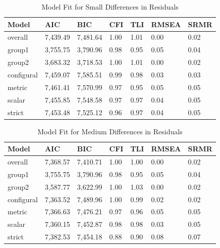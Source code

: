 \documentclass[
  man]{apa6}
\begin{document}
\begin{table}[tbp]

\begin{center}
\begin{threeparttable}

\caption{\label{tab:unnamed-chunk-8}Model Fit for Small Differences in Residuals}

\begin{tabular}{lllllll}
\toprule
Model & AIC & BIC & CFI & TLI & RMSEA & SRMR\\
\midrule
overall & 7,439.49 & 7,481.64 & 1.00 & 1.01 & 0.00 & 0.02\\
group1 & 3,755.75 & 3,790.96 & 0.98 & 0.95 & 0.05 & 0.04\\
group2 & 3,683.32 & 3,718.53 & 1.00 & 1.01 & 0.00 & 0.02\\
configural & 7,459.07 & 7,585.51 & 0.99 & 0.98 & 0.03 & 0.03\\
metric & 7,461.41 & 7,570.99 & 0.97 & 0.95 & 0.05 & 0.05\\
scalar & 7,455.85 & 7,548.58 & 0.97 & 0.97 & 0.04 & 0.05\\
strict & 7,453.48 & 7,525.12 & 0.96 & 0.97 & 0.04 & 0.05\\
\bottomrule
\end{tabular}

\end{threeparttable}
\end{center}

\end{table}

\begin{table}[tbp]

\begin{center}
\begin{threeparttable}

\caption{\label{tab:unnamed-chunk-9}Model Fit for Medium Differences in Residuals}

\begin{tabular}{lllllll}
\toprule
Model & AIC & BIC & CFI & TLI & RMSEA & SRMR\\
\midrule
overall & 7,368.57 & 7,410.71 & 1.00 & 1.00 & 0.00 & 0.02\\
group1 & 3,755.75 & 3,790.96 & 0.98 & 0.95 & 0.05 & 0.04\\
group2 & 3,587.77 & 3,622.99 & 1.00 & 1.03 & 0.00 & 0.02\\
configural & 7,363.52 & 7,489.96 & 1.00 & 0.99 & 0.02 & 0.02\\
metric & 7,366.63 & 7,476.21 & 0.97 & 0.96 & 0.05 & 0.05\\
scalar & 7,360.15 & 7,452.87 & 0.98 & 0.98 & 0.03 & 0.05\\
strict & 7,382.53 & 7,454.18 & 0.88 & 0.90 & 0.08 & 0.07\\
\bottomrule
\end{tabular}

\end{threeparttable}
\end{center}

\end{table}
\end{document}
